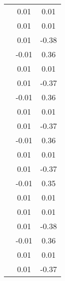 \begin{table}
\begin{tabular}{c|cc|}
\multicolumn{1}{|c|}{} & \multicolumn{1}{|c|}{      0.01} & \multicolumn{1}{|c|}{      0.01} \\ 
\multicolumn{1}{|c|}{} & \multicolumn{1}{|c|}{      0.01} & \multicolumn{1}{|c|}{      0.01} \\ 
\multicolumn{1}{|c|}{} & \multicolumn{1}{|c|}{      0.01} & \multicolumn{1}{|c|}{     -0.38} \\ 
\multicolumn{1}{|c|}{} & \multicolumn{1}{|c|}{     -0.01} & \multicolumn{1}{|c|}{      0.36} \\ 
\multicolumn{1}{|c|}{} & \multicolumn{1}{|c|}{      0.01} & \multicolumn{1}{|c|}{      0.01} \\ 
\multicolumn{1}{|c|}{} & \multicolumn{1}{|c|}{      0.01} & \multicolumn{1}{|c|}{     -0.37} \\ 
\multicolumn{1}{|c|}{} & \multicolumn{1}{|c|}{     -0.01} & \multicolumn{1}{|c|}{      0.36} \\ 
\multicolumn{1}{|c|}{} & \multicolumn{1}{|c|}{      0.01} & \multicolumn{1}{|c|}{      0.01} \\ 
\multicolumn{1}{|c|}{} & \multicolumn{1}{|c|}{      0.01} & \multicolumn{1}{|c|}{     -0.37} \\ 
\multicolumn{1}{|c|}{} & \multicolumn{1}{|c|}{     -0.01} & \multicolumn{1}{|c|}{      0.36} \\ 
\multicolumn{1}{|c|}{} & \multicolumn{1}{|c|}{      0.01} & \multicolumn{1}{|c|}{      0.01} \\ 
\multicolumn{1}{|c|}{} & \multicolumn{1}{|c|}{      0.01} & \multicolumn{1}{|c|}{     -0.37} \\ 
\multicolumn{1}{|c|}{} & \multicolumn{1}{|c|}{     -0.01} & \multicolumn{1}{|c|}{      0.35} \\ 
\multicolumn{1}{|c|}{} & \multicolumn{1}{|c|}{      0.01} & \multicolumn{1}{|c|}{      0.01} \\ 
\multicolumn{1}{|c|}{} & \multicolumn{1}{|c|}{      0.01} & \multicolumn{1}{|c|}{      0.01} \\ 
\multicolumn{1}{|c|}{} & \multicolumn{1}{|c|}{      0.01} & \multicolumn{1}{|c|}{     -0.38} \\ 
\multicolumn{1}{|c|}{} & \multicolumn{1}{|c|}{     -0.01} & \multicolumn{1}{|c|}{      0.36} \\ 
\multicolumn{1}{|c|}{} & \multicolumn{1}{|c|}{      0.01} & \multicolumn{1}{|c|}{      0.01} \\ 
\multicolumn{1}{|c|}{} & \multicolumn{1}{|c|}{      0.01} & \multicolumn{1}{|c|}{     -0.37} \\ 

\end{tabular}
\end{table}
